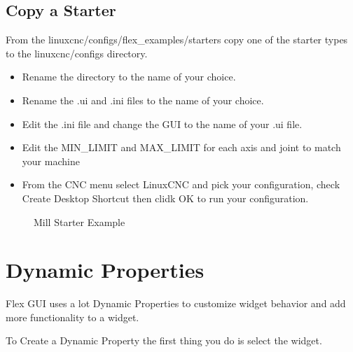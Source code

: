 \documentclass[letterpaper,10pt,english]{sphinxmanual}
\begin{document}
\section{Copy a Starter}
\label{\detokenize{build:copy-a-starter}}
\sphinxAtStartPar
From the linuxcnc/configs/flex\_examples/starters copy one of the starter types
to the linuxcnc/configs directory.
\begin{itemize}
\item {} 
\sphinxAtStartPar
Rename the directory to the name of your choice.

\item {} 
\sphinxAtStartPar
Rename the .ui and .ini files to the name of your choice.

\item {} 
\sphinxAtStartPar
Edit the .ini file and change the GUI to the name of your .ui file.

\item {} 
\sphinxAtStartPar
Edit the MIN\_LIMIT and MAX\_LIMIT for each axis and joint to match your machine

\item {} 
\sphinxAtStartPar
From the CNC menu select LinuxCNC and pick your configuration, check Create
Desktop Shortcut then clidk OK to run your configuration.

\end{itemize}

\begin{figure}[htbp]
\centering
\capstart

\noindent{}
\caption{Mill Starter Example}\label{\detokenize{build:id1}}\end{figure}

\sphinxstepscope


\chapter{Dynamic Properties}
\label{\detokenize{property:dynamic-properties}}\label{\detokenize{property::doc}}
\sphinxAtStartPar
Flex GUI uses a lot Dynamic Properties to customize widget behavior and add
more functionality to a widget.

\sphinxAtStartPar
To Create a Dynamic Property the first thing you do is select the widget.

\end{document}
